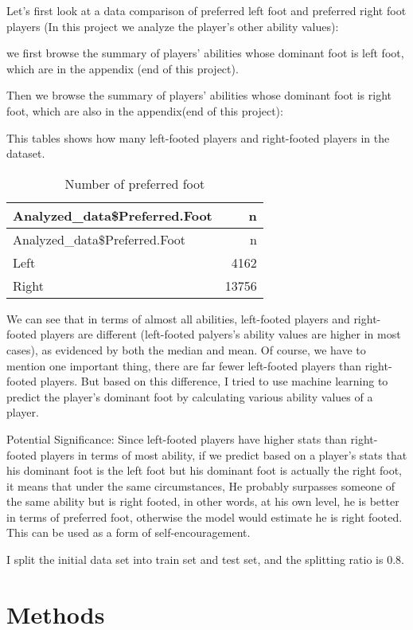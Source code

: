 \documentclass[
]{article}
\begin{document}
Let's first look at a data comparison of preferred left foot and
preferred right foot players (In this project we analyze the player's
other ability values):

we first browse the summary of players' abilities whose dominant foot is
left foot, which are in the appendix (end of this project).

Then we browse the summary of players' abilities whose dominant foot is
right foot, which are also in the appendix(end of this project):

This tables shows how many left-footed players and right-footed players
in the dataset.

\begin{longtable}[]{@{}lr@{}}
\caption{Number of preferred foot}\tabularnewline
\toprule
Analyzed\_data\$Preferred.Foot & n \\
\midrule
\endfirsthead
\toprule
Analyzed\_data\$Preferred.Foot & n \\
\midrule
\endhead
Left & 4162 \\
Right & 13756 \\
\bottomrule
\end{longtable}

We can see that in terms of almost all abilities, left-footed players
and right-footed players are different (left-footed palyers's ability
values are higher in most cases), as evidenced by both the median and
mean. Of course, we have to mention one important thing, there are far
fewer left-footed players than right-footed players. But based on this
difference, I tried to use machine learning to predict the player's
dominant foot by calculating various ability values of a player.

Potential Significance: Since left-footed players have higher stats than
right-footed players in terms of most ability, if we predict based on a
player's stats that his dominant foot is the left foot but his dominant
foot is actually the right foot, it means that under the same
circumstances, He probably surpasses someone of the same ability but is
right footed, in other words, at his own level, he is better in terms of
preferred foot, otherwise the model would estimate he is right footed.
This can be used as a form of self-encouragement.

I split the initial data set into train set and test set, and the
splitting ratio is 0.8.

\hypertarget{methods}{%
\section{Methods}\label{methods}}
\end{document}

